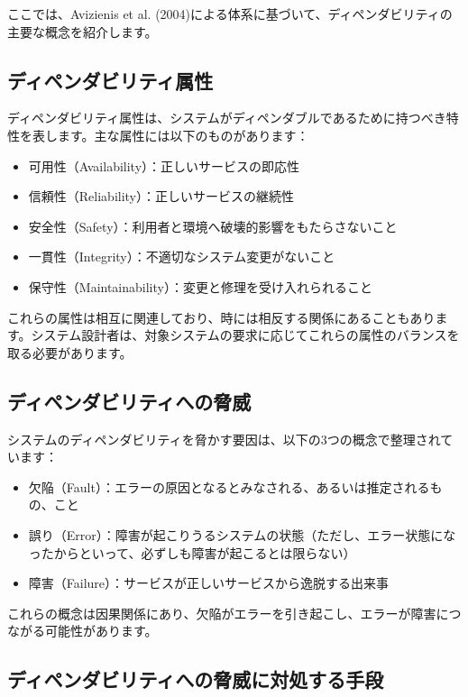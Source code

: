 ここでは、Avizienis et al. (2004)による体系に基づいて、ディペンダビリティの主要な概念を紹介します。

\subsection{ディペンダビリティ属性}

ディペンダビリティ属性は、システムがディペンダブルであるために持つべき特性を表します。主な属性には以下のものがあります：

\begin{itemize}
\item 可用性（Availability）：正しいサービスの即応性
\item 信頼性（Reliability）：正しいサービスの継続性
\item 安全性（Safety）：利用者と環境へ破壊的影響をもたらさないこと
\item 一貫性（Integrity）：不適切なシステム変更がないこと
\item 保守性（Maintainability）：変更と修理を受け入れられること
\end{itemize}

これらの属性は相互に関連しており、時には相反する関係にあることもあります。システム設計者は、対象システムの要求に応じてこれらの属性のバランスを取る必要があります。

\subsection{ディペンダビリティへの脅威}

システムのディペンダビリティを脅かす要因は、以下の3つの概念で整理されています：

\begin{itemize}
\item 欠陥（Fault）：エラーの原因となるとみなされる、あるいは推定されるもの、こと
\item 誤り（Error）：障害が起こりうるシステムの状態（ただし、エラー状態になったからといって、必ずしも障害が起こるとは限らない）
\item 障害（Failure）：サービスが正しいサービスから逸脱する出来事
\end{itemize}

これらの概念は因果関係にあり、欠陥がエラーを引き起こし、エラーが障害につながる可能性があります。

\subsection{ディペンダビリティへの脅威に対処する手段}

